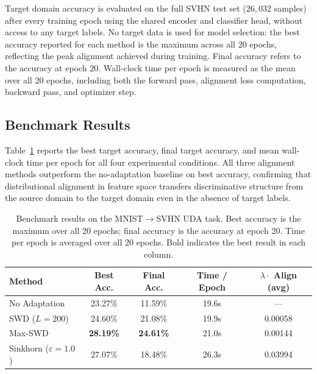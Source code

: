 \documentclass{article}
\begin{document}
	Target domain accuracy is evaluated on the full SVHN test set ($26{,}032$ samples) after every training epoch using the shared encoder and classifier head, without access to any target labels. No target data is used for model selection: the best accuracy reported for each method is the maximum across all $20$ epochs, reflecting the peak alignment achieved during training. Final accuracy refers to the accuracy at epoch $20$. Wall-clock time per epoch is measured as the mean over all $20$ epochs, including both the forward pass, alignment loss computation, backward pass, and optimizer step.
	
	\subsection{Benchmark Results}
	
	Table~\ref{tab:benchmark} reports the best target accuracy, final target accuracy, and mean wall-clock time per epoch for all four experimental conditions. All three alignment methods outperform the no-adaptation baseline on best accuracy, confirming that distributional alignment in feature space transfers discriminative structure from the source domain to the target domain even in the absence of target labels.
	
	\begin{table}[h]
		\centering
		\caption{Benchmark results on the MNIST$\to$SVHN UDA task. Best accuracy is the maximum over all 20 epochs; final accuracy is the accuracy at epoch 20. Time per epoch is averaged over all 20 epochs. Bold indicates the best result in each column.}
		\label{tab:benchmark}
		\begin{tabular}{lcccc}
			\toprule
			\textbf{Method} & \textbf{Best Acc.} & \textbf{Final Acc.} & 
			\textbf{Time / Epoch} & \textbf{$\lambda \cdot$ Align (avg)} \\
			\midrule
			No Adaptation & 23.27\% & 11.59\% & 19.6s & --- \\
			SWD ($L=200$) & 24.60\% & 21.08\% & 19.9s  & 0.00058 \\
			Max-SWD & \textbf{28.19\%} & \textbf{24.61\%}  & 21.0s  & 0.00144 \\
			Sinkhorn ($\varepsilon=1.0$) & 27.07\% & 18.48\% & 26.3s  & 0.03994 \\
			\bottomrule
		\end{tabular}
	\end{table}
	
\end{document}

